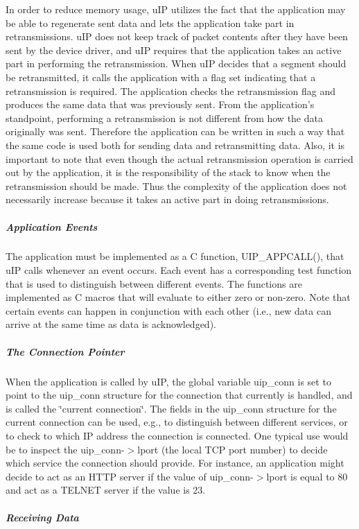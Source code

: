 \-In order to reduce memory usage, u\-I\-P utilizes the fact that the application may be able to regenerate sent data and lets the application take part in retransmissions. u\-I\-P does not keep track of packet contents after they have been sent by the device driver, and u\-I\-P requires that the application takes an active part in performing the retransmission. \-When u\-I\-P decides that a segment should be retransmitted, it calls the application with a flag set indicating that a retransmission is required. \-The application checks the retransmission flag and produces the same data that was previously sent. \-From the application's standpoint, performing a retransmission is not different from how the data originally was sent. \-Therefore the application can be written in such a way that the same code is used both for sending data and retransmitting data. \-Also, it is important to note that even though the actual retransmission operation is carried out by the application, it is the responsibility of the stack to know when the retransmission should be made. \-Thus the complexity of the application does not necessarily increase because it takes an active part in doing retransmissions.\hypertarget{a00060_appevents}{}\subparagraph{\-Application Events}\label{a00060_appevents}
\-The application must be implemented as a \-C function, \-U\-I\-P\-\_\-\-A\-P\-P\-C\-A\-L\-L(), that u\-I\-P calls whenever an event occurs. \-Each event has a corresponding test function that is used to distinguish between different events. \-The functions are implemented as \-C macros that will evaluate to either zero or non-\/zero. \-Note that certain events can happen in conjunction with each other (i.\-e., new data can arrive at the same time as data is acknowledged).\hypertarget{a00060_connstate}{}\subparagraph{\-The Connection Pointer}\label{a00060_connstate}
\-When the application is called by u\-I\-P, the global variable uip\-\_\-conn is set to point to the uip\-\_\-conn structure for the connection that currently is handled, and is called the \char`\"{}current connection\char`\"{}. \-The fields in the uip\-\_\-conn structure for the current connection can be used, e.\-g., to distinguish between different services, or to check to which \-I\-P address the connection is connected. \-One typical use would be to inspect the uip\-\_\-conn-\/$>$lport (the local \-T\-C\-P port number) to decide which service the connection should provide. \-For instance, an application might decide to act as an \-H\-T\-T\-P server if the value of uip\-\_\-conn-\/$>$lport is equal to 80 and act as a \-T\-E\-L\-N\-E\-T server if the value is 23.\hypertarget{a00060_recvdata}{}\subparagraph{\-Receiving Data}\label{a00060_recvdata}
